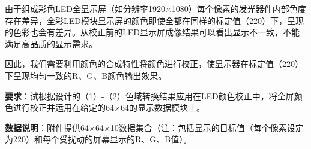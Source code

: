 由于组成彩色LED全显示屏（如分辨率1920×1080）每个像素的发光器件内部色度存在差异，全彩LED模块显示屏的颜色即使全都在同样的标定值（220）下，呈现的色彩也会有差异。从校正前的LED显示屏成像结果可以看出显示不一致，不能满足高品质的显示需求。

因此，我们需要利用颜色的合成特性将颜色进行校正，使显示器在标定值（220）下呈现均匀一致的R、G、B颜色输出效果。

\textbf{要求}：试根据设计的（1）-（2）色域转换结果应用在LED颜色校正中，将全屏颜色进行校正并运用在给定的64×64的显示数据模块上。

\textbf{数据说明}：附件提供64×64×10数据集合（注：包括显示的目标值（每个像素设定为220）和每个受扰动的屏幕显示的R、G、B值）。
